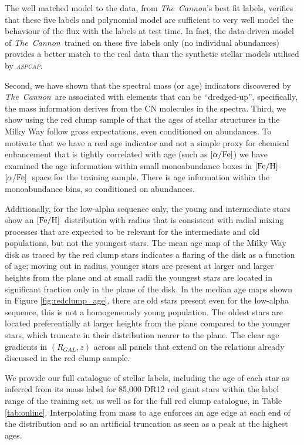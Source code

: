 \documentclass[12pt, preprint]{aastex}
\newcommand{\project}[1]{\textsl{#1}}
\newcommand{\tc}{\project{The~Cannon}}
\newcommand{\aspcap}{\project{\textsc{aspcap}}}
\newcommand{\feh}{\mbox{$\rm [Fe/H]$}}
\newcommand{\alphafe}{\mbox{$\rm [\alpha/Fe]$}}
\begin{document}
The well matched model to the data, from \tc's best fit labels, verifies that these five labels and polynomial model are sufficient to very well model the behaviour of the flux with the labels at test time.  In fact, the data-driven model of \tc\ trained on these five labels only (no individual abundances) provides a better match to the real data than the synthetic stellar models utilised by \aspcap.

Second, we have shown that the spectral mass (or age) indicators discovered by \tc\ are associated with elements that can be ``dredged-up'', specifically, the mass information derives from the CN molecules in the spectra. Third, we show using the red clump sample of \citet{Bovy2014} that the ages of stellar structures in the Milky Way follow gross expectations, even conditioned on abundances. To motivate that we have a real age indicator and not a simple proxy for chemical enhancement that is tightly correlated with age (such as \alphafe) we have examined the age information within small monoabundance boxes in \feh-\alphafe\ space for the training sample. There is age information within the monoabundance bins, so conditioned on abundances. 

Additionally, for the low-alpha sequence only, the young and intermediate stars show an \feh\ distribution with radius that is consistent with radial mixing processes that are expected to be relevant for the intermediate and old populations, but not the youngest stars.  The mean age map of the Milky Way disk as traced by the red clump stars indicates a flaring of the disk as a function of age; moving out in radius, younger stars are present at larger and larger heights from the plane and at small radii the youngest stars are located in significant fraction only in the plane of the disk. In the median age maps shown in Figure \ref{fig:redclump_age}, there are old stars present even for the low-alpha sequence, this is not a homogeneously young population. The oldest stars are located preferentially at larger heights from the plane compared to the younger stars, which truncate in their distribution nearer to the plane.  The clear age gradients in $(R_{GAL},z)$ across all panels that extend on the relations already discussed in the red clump sample.

We provide our full catalogue of stellar labels, including the age of each star as inferred from its mass label for 85,000 DR12 red giant stars within the label range of the training set, as well as for the full red clump catalogue, in Table \ref{tab:online}.  Interpolating from mass to age enforces an age edge at each end of the distribution and so an artificial truncation as seen as a peak at the highest ages. %
\end{document}
